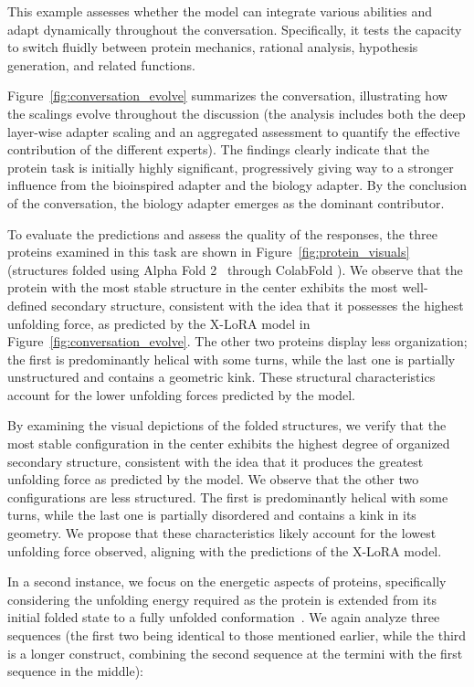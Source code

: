 This example assesses whether the model can integrate various abilities and adapt dynamically throughout the conversation. Specifically, it tests the capacity to switch fluidly between protein mechanics, rational analysis, hypothesis generation, and related functions.

Figure~\ref{fig:conversation_evolve} summarizes the conversation, illustrating how the scalings evolve throughout the discussion (the analysis includes both the deep layer-wise adapter scaling and an aggregated assessment to quantify the effective contribution of the different experts). The findings clearly indicate that the protein task is initially highly significant, progressively giving way to a stronger influence from the bioinspired adapter and the biology adapter. By the conclusion of the conversation, the biology adapter emerges as the dominant contributor.

To evaluate the predictions and assess the quality of the responses, the three proteins examined in this task are shown in Figure~\ref{fig:protein_visuals} (structures folded using Alpha Fold 2~\cite{Jumper2021HighlyAlphaFoldb} through ColabFold \cite{Mirdita2022ColabFold:All}). We observe that the protein with the most stable structure in the center exhibits the most well-defined secondary structure, consistent with the idea that it possesses the highest unfolding force, as predicted by the X-LoRA model in Figure~\ref{fig:conversation_evolve}. The other two proteins display less organization; the first is predominantly helical with some turns, while the last one is partially unstructured and contains a geometric kink. These structural characteristics account for the lower unfolding forces predicted by the model.

By examining the visual depictions of the folded structures, we verify that the most stable configuration in the center exhibits the highest degree of organized secondary structure, consistent with the idea that it produces the greatest unfolding force as predicted by the model. We observe that the other two configurations are less structured. The first is predominantly helical with some turns, while the last one is partially disordered and contains a kink in its geometry. We propose that these characteristics likely account for the lowest unfolding force observed, aligning with the predictions of the X-LoRA model.

In a second instance, we focus on the energetic aspects of proteins, specifically considering the unfolding energy required as the protein is extended from its initial folded state to a fully unfolded conformation~\cite{Ni2023ForceGen:Model}. We again analyze three sequences (the first two being identical to those mentioned earlier, while the third is a longer construct, combining the second sequence at the termini with the first sequence in the middle):

